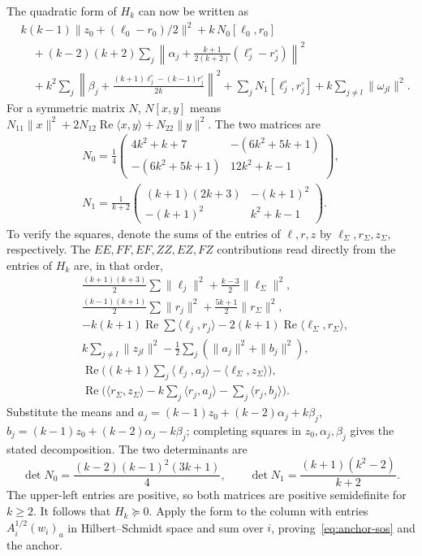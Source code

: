\documentclass[11pt]{article}
\begin{document}
The quadratic form of \(H_k\) can now be written as
\begin{align*}
&k(k-1)\|z_0+(\ell_0-r_0)/2\|^2
    +k\,N_0[\ell_0,r_0]\\
&\quad +(k-2)(k+2)\sum_j
 \left\|\alpha_j+\frac{k+1}{2(k+2)}(\ell_j^\circ-r_j^\circ)\right\|^2\\
&\quad +k^2\sum_j
 \left\|\beta_j+\frac{(k+1)\ell_j^\circ-(k-1)r_j^\circ}{2k}\right\|^2
    +\sum_j N_1[\ell_j^\circ,r_j^\circ]+k\sum_{j\ne l}\|\omega_{jl}\|^2 .
\end{align*}
For a symmetric matrix \(N\), \(N[x,y]\) means
\(N_{11}\|x\|^2+2N_{12}\operatorname{Re}\langle x,y\rangle+
N_{22}\|y\|^2\). The two matrices are
\[
\begin{gathered}
N_0=\frac14
\begin{pmatrix}
4k^2+k+7&-(6k^2+5k+1)\\
-(6k^2+5k+1)&12k^2+k-1
\end{pmatrix},\\
N_1=\frac1{k+2}
\begin{pmatrix}
(k+1)(2k+3)&-(k+1)^2\\
-(k+1)^2&k^2+k-1
\end{pmatrix}.
\end{gathered}
\]
To verify the squares, denote the sums of the entries
of \(\ell,r,z\) by \(\ell_\Sigma,r_\Sigma,z_\Sigma\), respectively.
The \(EE,FF,EF,ZZ,EZ,FZ\) contributions read directly
from the entries of \(H_k\) are, in that order,
\begin{align*}
 &\tfrac{(k+1)(k+3)}2\sum\|\ell_j\|^2+
        \tfrac{k-3}{2}\|\ell_\Sigma\|^2,\\
 &\tfrac{(k-1)(k+1)}2\sum\|r_j\|^2+
        \tfrac{5k+1}{2}\|r_\Sigma\|^2,\\
 &-k(k+1)\operatorname{Re}\sum\langle\ell_j,r_j\rangle
    -2(k+1)\operatorname{Re}\langle\ell_\Sigma,r_\Sigma\rangle,\\
 &k\sum_{j\ne l}\|z_{jl}\|^2-\tfrac12\sum_j(\|a_j\|^2+\|b_j\|^2),\\
 &\operatorname{Re}\big((k+1)\sum_j\langle\ell_j,a_j\rangle
                  -\langle\ell_\Sigma,z_\Sigma\rangle\big),\\
 &\operatorname{Re}\big(\langle r_\Sigma,z_\Sigma\rangle
                -k\sum_j\langle r_j,a_j\rangle-\sum_j\langle r_j,b_j\rangle\big).
\end{align*}
Substitute the means and
\(a_j=(k-1)z_0+(k-2)\alpha_j+k\beta_j\),
\(b_j=(k-1)z_0+(k-2)\alpha_j-k\beta_j\); completing squares
in \(z_0,\alpha_j,\beta_j\) gives the stated decomposition.
The two determinants are
\[
\det N_0=\frac{(k-2)(k-1)^2(3k+1)}4,\qquad
\det N_1=\frac{(k+1)(k^2-2)}{k+2}.
\]
The upper-left entries are positive, so both matrices are positive
semidefinite for \(k\ge2\).
It follows that \(H_k\succeq0\). Apply the form to the column with
entries \(A_i^{1/2}(w_i)_a\) in Hilbert--Schmidt space and sum
over \(i\), proving~\eqref{eq:anchor-sos} and the anchor.
\end{document}
